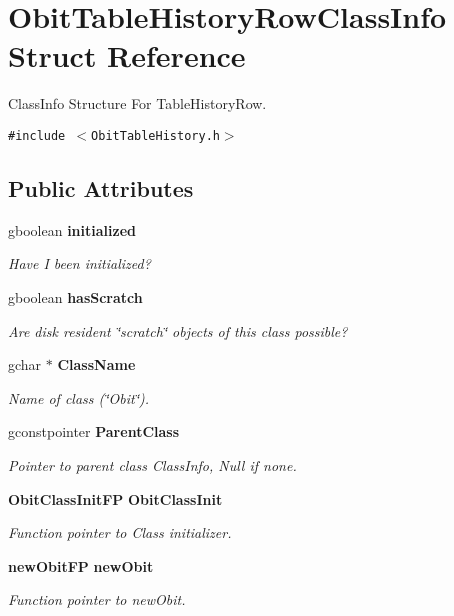\section{Obit\-Table\-History\-Row\-Class\-Info Struct Reference}
\label{structObitTableHistoryRowClassInfo}
Class\-Info Structure For Table\-History\-Row.  


{\tt \#include $<$Obit\-Table\-History.h$>$}

\subsection*{Public Attributes}
\begin{CompactItemize}
\item 
gboolean {\bf initialized}
\begin{CompactList}\small\item\em Have I been initialized? \item\end{CompactList}\item 
gboolean {\bf has\-Scratch}
\begin{CompactList}\small\item\em Are disk resident \char`\"{}scratch\char`\"{} objects of this class possible? \item\end{CompactList}\item 
gchar $\ast$ {\bf Class\-Name}
\begin{CompactList}\small\item\em Name of class (\char`\"{}Obit\char`\"{}). \item\end{CompactList}\item 
gconstpointer {\bf Parent\-Class}
\begin{CompactList}\small\item\em Pointer to parent class Class\-Info, Null if none. \item\end{CompactList}\item 
{\bf Obit\-Class\-Init\-FP} {\bf Obit\-Class\-Init}
\begin{CompactList}\small\item\em Function pointer to Class initializer. \item\end{CompactList}\item 
{\bf new\-Obit\-FP} {\bf new\-Obit}
\begin{CompactList}\small\item\em Function pointer to new\-Obit. \item\end{CompactList}\item 

\end{CompactItemize}
